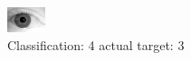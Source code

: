 \begin{figure}[h!]
\begin{center}
\includegraphics[width=0.60\columnwidth]{figures/ID2150_class_4_target_3.png}
\end{center}
\caption{ Classification: 4 actual target: 3}
\label{fig:ID2150_class_4_target_3}
\end{figure}
